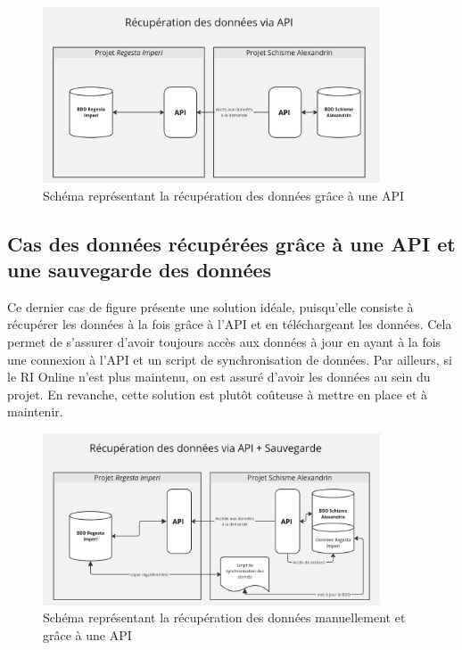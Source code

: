 \begin{figure}[H]
    \centering
    \includegraphics[width=10cm]{images/recup-donnees-api.jpg}
    \caption{Schéma représentant la récupération des données grâce à une API}
    \label{fig:schemaAPI}
\end{figure}

    \subsection{Cas des données récupérées grâce à une API et une sauvegarde des données}

Ce dernier cas de figure présente une solution idéale, puisqu'elle consiste à récupérer les données à la fois grâce à l'API et en téléchargeant les données. Cela permet de s'assurer d'avoir toujours accès aux données à jour en ayant à la fois une connexion à l'API et un script de synchronisation de données. Par ailleurs, si le RI Online n'est plus maintenu, on est assuré d'avoir les données au sein du projet. En revanche, cette solution est plutôt coûteuse à mettre en place et à maintenir.\\

\begin{figure}[H]
    \centering
    \includegraphics[width=10cm]{images/recup-donnees-api-and-backup.jpg}
    \caption{Schéma représentant la récupération des données manuellement et grâce à une API}
    \label{fig:schemaAPIetbackup}
\end{figure}





